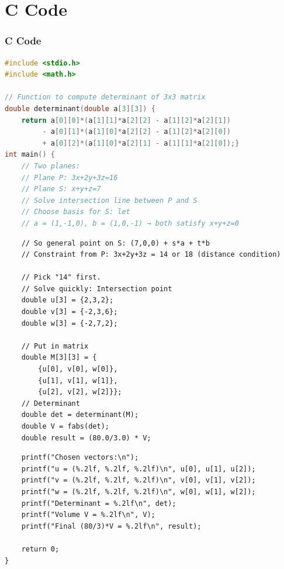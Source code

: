\documentclass{beamer}
\theoremstyle{remark}
\numberwithin{equation}{section}
\begin{document}
\section{C Code}
\begin{frame}[fragile]
\frametitle{C Code }
\begin{lstlisting}[language=C]
#include <stdio.h>
#include <math.h>

// Function to compute determinant of 3x3 matrix
double determinant(double a[3][3]) {
    return a[0][0]*(a[1][1]*a[2][2] - a[1][2]*a[2][1])
         - a[0][1]*(a[1][0]*a[2][2] - a[1][2]*a[2][0])
         + a[0][2]*(a[1][0]*a[2][1] - a[1][1]*a[2][0]);}
int main() {
    // Two planes:
    // Plane P: 3x+2y+3z=16
    // Plane S: x+y+z=7
    // Solve intersection line between P and S
    // Choose basis for S: let
    // a = (1,-1,0), b = (1,0,-1) → both satisfy x+y+z=0
    \end{lstlisting}
    \end{frame}
    \begin{frame}[fragile]
    \begin{lstlisting}
    // So general point on S: (7,0,0) + s*a + t*b
    // Constraint from P: 3x+2y+3z = 14 or 18 (distance condition)
    
    // Pick "14" first.
    // Solve quickly: Intersection point
    double u[3] = {2,3,2};
    double v[3] = {-2,3,6};
    double w[3] = {-2,7,2};
    
    // Put in matrix
    double M[3][3] = {
        {u[0], v[0], w[0]},
        {u[1], v[1], w[1]},
        {u[2], v[2], w[2]}};
    // Determinant
    double det = determinant(M);
    double V = fabs(det);
    double result = (80.0/3.0) * V;
\end{lstlisting}
\end{frame}
\begin{frame}[fragile]
\begin{lstlisting}
    printf("Chosen vectors:\n");
    printf("u = (%.2lf, %.2lf, %.2lf)\n", u[0], u[1], u[2]);
    printf("v = (%.2lf, %.2lf, %.2lf)\n", v[0], v[1], v[2]);
    printf("w = (%.2lf, %.2lf, %.2lf)\n", w[0], w[1], w[2]);
    printf("Determinant = %.2lf\n", det);
    printf("Volume V = %.2lf\n", V);
    printf("Final (80/3)*V = %.2lf\n", result);

    return 0;
}

\end{lstlisting}
\end{frame}
\end{document}
